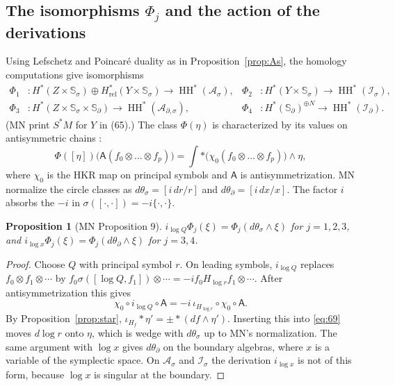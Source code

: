 \documentclass[11pt,oneside,reqno]{article}
\DeclareMathOperator{\HH}{HH}
\newcommand{\Is}{\mathcal I_\sigma}
\newcommand{\Id}{\mathcal I_\partial}
\newcommand{\As}{\mathcal A_\sigma}
\newcommand{\Ads}{\mathcal A_{\partial,\sigma}}
\newcommand{\Ssig}{\mathbb S_\sigma}
\newcommand{\Sd}{\mathbb S_\partial}
\newcommand{\Hrel}{H_{\mathrm{rel}}}
\newcommand{\lQ}{\log Q}
\newcommand{\lx}{\log x}
\theoremstyle{plain}
\newtheorem{proposition}[theorem]{Proposition}
\theoremstyle{definition}
\theoremstyle{remark}
\begin{document}
\subsection{The isomorphisms \texorpdfstring{\(\Phi_j\)}{Phi} and the action of the derivations}
Using Lefschetz and Poincar\'e duality as in Proposition~\ref{prop:As},
the homology computations give isomorphisms \cite[(65)--(68)]{MN}
\begin{align*}
 \Phi_1&:H^*(Z\times\Ssig)\oplus\Hrel^*(Y\times\Ssig)\to\HH^*(\As),&
 \Phi_2&:H^*(Y\times\Ssig)\to\HH^*(\Is),\\
 \Phi_3&:H^*(Z\times\Ssig\times\Sd)\to\HH^*(\Ads),&
 \Phi_4&:H^*(\Sd)^{\oplus N}\to\HH^*(\Id).
\end{align*}
(MN print \(S^*M\) for \(Y\) in (65).) The class \(\Phi(\eta)\) is
characterized by its values on antisymmetric chains \cite[(69)]{MN}:
\begin{equation}\label{eq:69}
 \Phi([\eta])\bigl(\mathsf A(f_0\otimes\dots\otimes f_p)\bigr)=
 \int*\bigl(\chi_0(f_0\otimes\dots\otimes f_p)\bigr)\wedge\eta ,
\end{equation}
where \(\chi_0\) is the HKR map on principal symbols and \(\mathsf A\) is
antisymmetrization. MN normalize the circle classes as
\(d\theta_\sigma=[i\,dr/r]\) and \(d\theta_\partial=[i\,dx/x]\). The factor
\(i\) absorbs the \(-i\) in \(\sigma([\cdot,\cdot])=-i\{\cdot,\cdot\}\).

\begin{proposition}[MN Proposition 9]\label{prop:Phi}
\(i_{\lQ}\Phi_j(\xi)=\Phi_j(d\theta_\sigma\wedge\xi)\) for \(j=1,2,3\), and
\(i_{\lx}\Phi_j(\xi)=\Phi_j(d\theta_\partial\wedge\xi)\) for \(j=3,4\).
\end{proposition}

\begin{proof}
Choose \(Q\) with principal symbol \(r\). On leading symbols,
\(i_{\lQ}\) replaces \(f_0\otimes f_1\otimes\cdots\) by
\(f_0\sigma([\lQ,f_1])\otimes\cdots=-if_0H_{\log r}f_1\otimes\cdots\). After
antisymmetrization this gives
\[
 \chi_0\circ i_{\lQ}\circ\mathsf A=-i\,\iota_{H_{\log r}}\circ\chi_0
 \circ\mathsf A .
\]
By Proposition~\ref{prop:star}, \(\iota_{H_f}*\eta'=\pm*(df\wedge\eta')\).
Inserting this into \eqref{eq:69} moves \(d\log r\) onto \(\eta\), which
is wedge with \(d\theta_\sigma\) up to MN's normalization. The same
argument with \(\log x\) gives \(d\theta_\partial\) on the boundary
algebras, where \(x\) is a variable of the symplectic space. On \(\As\)
and \(\Is\) the derivation \(i_{\lx}\) is not of this form, because
\(\log x\) is singular at the boundary.
\end{proof}
\end{document}
